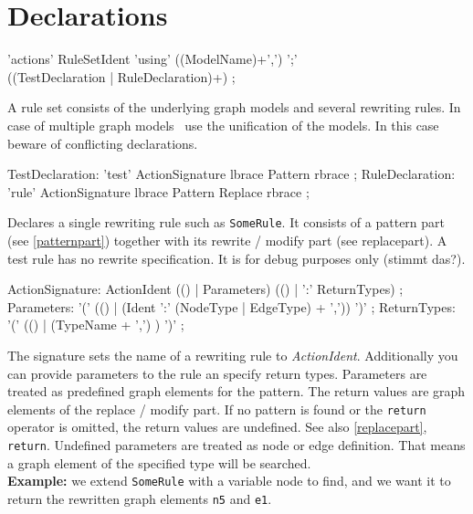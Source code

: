 \section{Declarations}
\label{ruledecls}
\begin{rail}
  'actions' RuleSetIdent 'using' ((ModelName)+',') ';' \\ ((TestDeclaration | RuleDeclaration)+) ;
\end{rail}
A rule set consists of the underlying graph models and several rewriting rules. In case of multiple graph models \GrG\ use the unification of the models. In this case beware of conflicting declarations.

\begin{rail}
  TestDeclaration: 'test' ActionSignature lbrace Pattern rbrace ;
  RuleDeclaration: 'rule' ActionSignature lbrace Pattern Replace rbrace ;
\end{rail}
Declares a single rewriting rule such as \texttt{SomeRule}. It consists of a pattern part (see \ref{patternpart}) together with its rewrite / modify part (see {replacepart}). A test rule has no rewrite specification. It is for debug purposes only (stimmt das?). 

\begin{rail}  
  ActionSignature: ActionIdent (() | Parameters) (() | ':' ReturnTypes) ;
  Parameters: '(' (() | (Ident ':' (NodeType | EdgeType) + ',')) ')' ;
  ReturnTypes: '(' (() | (TypeName + ',') ) ')' ;
\end{rail}
The signature sets the name of a rewriting rule to \emph{ActionIdent}. Additionally you can provide parameters to the rule an specify return types. Parameters are treated as predefined graph elements for the pattern. The return values are graph elements of the replace / modify part. If no pattern is found or the \texttt{return} operator is omitted, the return values are undefined. See also \ref{replacepart}, \texttt{return}. Undefined parameters are treated as node or edge definition. That means a graph element of the specified type will be searched.\\
{\small \textbf{Example:} we extend \texttt{SomeRule} with a variable node to find, and we want it to return the rewritten graph elements \texttt{n5} and \texttt{e1}.}
\begin{grgen}
  rule SomeRuleExt(varnode: Node): (Node, EdgeTypeB) {
    pattern{
      varnode;
      n1: NodeTypeA;
      ...
    }
    replace {
      varnode;
      ...  
      return(n5, e1);
      eval {
        ...
\end{grgen}

